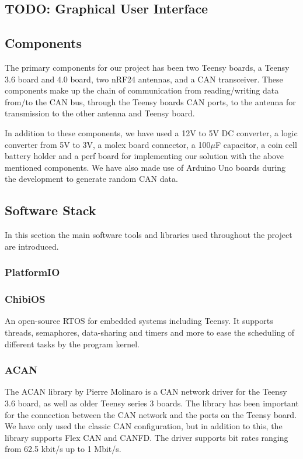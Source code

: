 \documentclass[conference]{IEEEtran}
\newcommand{\todo}[1]{{\color{olive} TODO: #1}}
\begin{document}
\subsection{\todo{Graphical User Interface}}


\subsection{Components}
The primary components for our project has been two Teensy boards, a Teensy 3.6 board and 4.0 board, two nRF24 antennas, and a CAN transceiver. These components make up the chain of communication from reading/writing data from/to the CAN bus, through the Teensy boards CAN ports, to the antenna for transmission to the other antenna and Teensy board.

In addition to these components, we have used a 12V to 5V DC converter, a logic converter from 5V to 3V, a molex board connector, a 100\(\mu\)F capacitor, a coin cell battery holder and a perf board for implementing our solution with the above mentioned components. We have also made use of Arduino Uno boards during the development to generate random CAN data.

\subsection{Software Stack}

In this section the main software tools and libraries used throughout the project are introduced.

\subsubsection{PlatformIO}


\subsubsection{ChibiOS}
An open-source RTOS for embedded systems including Teensy. It supports threads, semaphores, data-sharing and timers and more to ease the scheduling of different tasks by the program kernel. 

\subsubsection{ACAN}
The ACAN library by Pierre Molinaro is a CAN network driver for the Teensy 3.6 board, as well as older Teensy series 3 boards. The library has been important for the connection between the CAN network and the ports on the Teensy board. We have only used the classic CAN configuration, but in addition to this, the library supports Flex CAN and CANFD. The driver supports bit rates ranging from 62.5 kbit/s up to 1 Mbit/s\cite{ACAN}.
\end{document}
